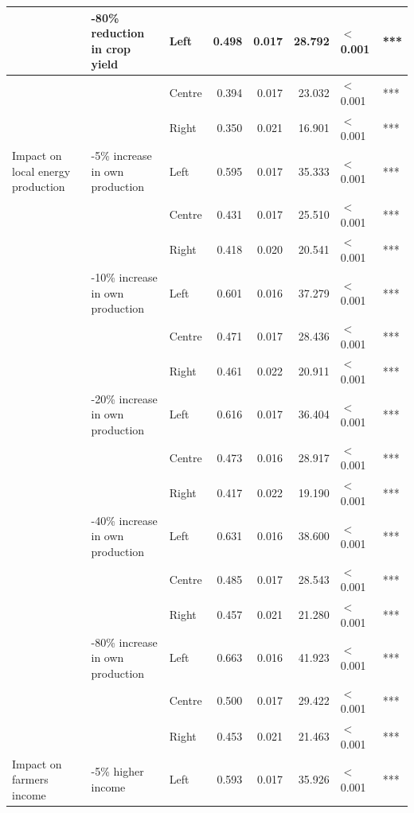 \begin{longtable}[t]{>{\raggedright\arraybackslash}p{4cm}>{\raggedright\arraybackslash}p{4cm}>{\raggedright\arraybackslash}p{2.5cm}rrrll}
\cmidrule{2-8}\nopagebreak
 & 41-80\% reduction in crop yield & Left & 0.498 & 0.017 & 28.792 & $<$0.001 & ***\\
\cmidrule{3-8}\nopagebreak
 &  & Centre & 0.394 & 0.017 & 23.032 & $<$0.001 & ***\\
\cmidrule{3-8}\nopagebreak
 &  & Right & 0.350 & 0.021 & 16.901 & $<$0.001 & ***\\
\cmidrule{1-8}\pagebreak[0]
Impact on local energy production & 0-5\% increase in own production & Left & 0.595 & 0.017 & 35.333 & $<$0.001 & ***\\
\cmidrule{3-8}\nopagebreak
 &  & Centre & 0.431 & 0.017 & 25.510 & $<$0.001 & ***\\
\cmidrule{3-8}\nopagebreak
 &  & Right & 0.418 & 0.020 & 20.541 & $<$0.001 & ***\\
\cmidrule{2-8}\nopagebreak
 & 6-10\% increase in own production & Left & 0.601 & 0.016 & 37.279 & $<$0.001 & ***\\
\cmidrule{3-8}\nopagebreak
 &  & Centre & 0.471 & 0.017 & 28.436 & $<$0.001 & ***\\
\cmidrule{3-8}\nopagebreak
 &  & Right & 0.461 & 0.022 & 20.911 & $<$0.001 & ***\\
\cmidrule{2-8}\nopagebreak
 & 11-20\% increase in own production & Left & 0.616 & 0.017 & 36.404 & $<$0.001 & ***\\
\cmidrule{3-8}\nopagebreak
 &  & Centre & 0.473 & 0.016 & 28.917 & $<$0.001 & ***\\
\cmidrule{3-8}\nopagebreak
 &  & Right & 0.417 & 0.022 & 19.190 & $<$0.001 & ***\\
\cmidrule{2-8}\nopagebreak
 & 21-40\% increase in own production & Left & 0.631 & 0.016 & 38.600 & $<$0.001 & ***\\
\cmidrule{3-8}\nopagebreak
 &  & Centre & 0.485 & 0.017 & 28.543 & $<$0.001 & ***\\
\cmidrule{3-8}\nopagebreak
 &  & Right & 0.457 & 0.021 & 21.280 & $<$0.001 & ***\\
\cmidrule{2-8}\nopagebreak
 & 41-80\% increase in own production & Left & 0.663 & 0.016 & 41.923 & $<$0.001 & ***\\
\cmidrule{3-8}\nopagebreak
 &  & Centre & 0.500 & 0.017 & 29.422 & $<$0.001 & ***\\
\cmidrule{3-8}\nopagebreak
 &  & Right & 0.453 & 0.021 & 21.463 & $<$0.001 & ***\\
\cmidrule{1-8}\pagebreak[0]
Impact on farmers income & 0-5\% higher income & Left & 0.593 & 0.017 & 35.926 & $<$0.001 & ***\\

\end{longtable}

